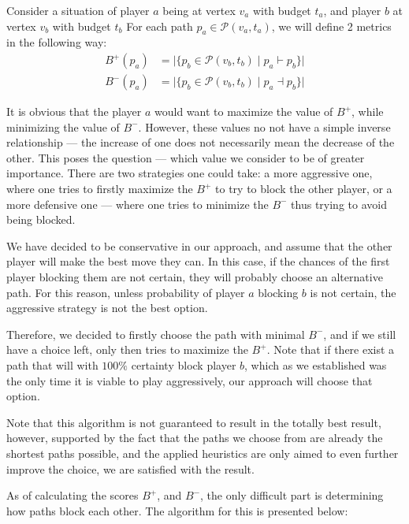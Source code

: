 \documentclass[12pt]{article}
\newcommand*{\p}{\ensuremath{\mathcal{P}}}
\newcommand*{\blocks}{\vdash}
\newcommand*{\blockedBy}{\dashv}
\newcommand*{\blockingScore}{B^+}
\newcommand*{\blockedScore}{B^-}
\begin{document}
Consider a situation of player $a$ being at vertex $v_a$ with budget $t_a$,
and player $b$ at vertex $v_b$ with budget $t_b$
For each path $p_a \in \p(v_a, t_a)$, we will define 2 metrics in the following way:
\begin{align}
    \blockingScore(p_a) & = \big| \{ p_b \in \p(v_b,t_b) \mid p_a \blocks p_b \} \big| \label{eq:blocking_score}   \\[.5ex]
    \blockedScore(p_a)  & = \big| \{ p_b \in \p(v_b,t_b) \mid p_a \blockedBy p_b \} \big| \label{eq:blocked_score}
\end{align}

It is obvious that the player $a$ would want to maximize the value of $\blockingScore$,
while minimizing the value of $\blockedScore$.
However, these values no not have a simple inverse relationship --- the increase of one does not necessarily mean the decrease of the other.
This poses the question --- which value we consider to be of greater importance.
There are two strategies one could take: a more aggressive one, where one tries to firstly maximize the $\blockingScore$ to try to block the other player,
or a more defensive one --- where one tries to minimize the $\blockedScore$ thus trying to avoid being blocked.

We have decided to be conservative in our approach, and assume that the other player will make the best move they can.
In this case, if the chances of the first player blocking them are not certain, they will probably choose an alternative path.
For this reason, unless probability of player $a$ blocking $b$ is not certain, the aggressive strategy is not the best option.

Therefore, we decided to firstly choose the path with minimal $\blockedScore$,
and if we still have a choice left, only then tries to maximize the $\blockingScore$.
Note that if there exist a path that will with $100\%$ certainty block player $b$,
which as we established was the only time it is viable to play aggressively, our approach will choose that option.

Note that this algorithm is not guaranteed to result in the totally best result, 
however, supported by the fact that the paths we choose from are already the shortest paths possible,
and the applied heuristics are only aimed to even further improve the choice, we are satisfied with the result.

As of calculating the scores $\blockingScore$, and $\blockedScore$, the only difficult part is determining how paths block each other.
The algorithm for this is presented below:
\end{document}
